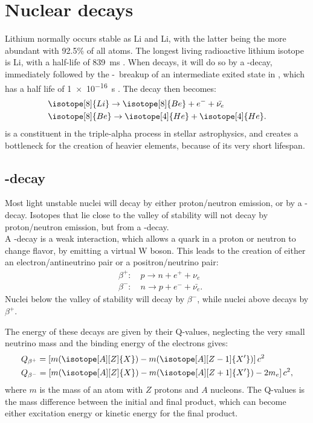 \section{Nuclear decays}
Lithium normally occurs stable as \isotope[6]Li and \isotope[7]Li, with the latter being the more abundant with 92.5\% of all atoms. The longest living radioactive lithium isotope is \isotope[8]Li, with a half-life of \SI{839}{ms} \cite{TILLEY2004155}. 
When \li decays, it will do so by a \be-decay, immediately followed by the \al-\al\ breakup of an intermediate exited state in \ber, which has a half life of \SI{1e-16}{s} \cite{TILLEY2004155}. The decay then becomes:
\begin{align*}
&\isotope[8]{Li} \rightarrow \isotope[8]{Be} + e^- + \bar{\nu_e} \\
&\isotope[8]{Be} \rightarrow \isotope[4]{He} + \isotope[4]{He}. \label{eq:reaction}
\end{align*}
\ber is a constituent in the triple-alpha process in stellar astrophysics, and creates a bottleneck for the creation of heavier elements, because of its very short lifespan. 

\subsection{\be-decay}
\label{sec:beta}
Most light unstable nuclei will decay by either proton/neutron emission, or by a \be-decay. Isotopes that lie close to the valley of stability will not decay by proton/neutron emission, but from a \be-decay.
\\
A \be-decay is a weak interaction, which allows a quark in a proton or neutron to change flavor, by emitting a virtual W boson. This leads to the creation of either an electron/antineutrino pair or a positron/neutrino pair:
\begin{align}
&\beta^+:\quad p\rightarrow n + e^+ + \nu_e\\
&\beta^-:\quad n\rightarrow p + e^- + \bar{\nu_e}.
\end{align}
Nuclei below the valley of stability will decay by $\beta^-$, while nuclei above decays by $\beta ^+$.

The energy of these decays are given by their Q-values, neglecting the very small neutrino mass and the binding energy of the electrons gives:
\begin{align}
&Q_{\beta^+} = \left[ m (\isotope[A][Z]{X}) - m(\isotope[A][Z-1]{X'})  		 \right] c^2\\
&Q_{\beta^-} = \left[ m (\isotope[A][Z]{X}) - m(\isotope[A][Z+1]{X'}) -2m_e  \right] c^2,
\end{align}
where $m$ is the mass of an atom with $Z$ protons and $A$ nucleons.
The Q-values is the mass difference between the initial and final product, which can become either excitation energy or kinetic energy for the final product. 

